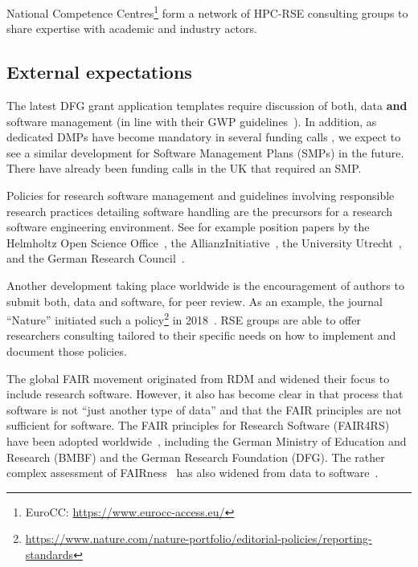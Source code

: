 \documentclass[a4paper]{article}
\begin{document}
 National Competence Centres\footnote{EuroCC: \url{https://www.eurocc-access.eu/}} form a network of HPC-RSE consulting groups to share expertise with academic and industry actors\autocite{eurocc_success_stories_2023,eurocc_success_stories_2024}.

\subsection{External expectations}

The latest DFG grant application templates require discussion of both, data \textbf{and} software management (in line with their GWP guidelines~\autocite{dfg_gsp}).
In addition, as dedicated DMPs have become mandatory in several funding calls , we expect to see a similar development for Software Management Plans (SMPs) in the future.  There have already been funding calls in the UK that required an SMP.

Policies for research software management and guidelines involving responsible research practices detailing software handling are the precursors for a research software engineering environment.
See for example position papers by the Helmholtz Open Science Office~\autocite{Helmholtz2019a,Helmholtz2019b},
the AllianzInitiative~\autocite{Konrad2021},
the University Utrecht~\autocite{Utrecht2016b},
and the German Research Council~\autocite{dfg_gsp}.

Another development taking place worldwide is the encouragement of authors to submit both, data and software, for peer review.
As an example, the journal “Nature” initiated such a policy\footnote{\url{https://www.nature.com/nature-portfolio/editorial-policies/reporting-standards}} in 2018~\autocite{Nature2018}.
RSE groups are able to offer researchers consulting tailored to their specific needs on how to implement and document those policies.

The global FAIR movement originated from RDM and widened their focus to include research software.
However, it also has become clear in that process that software is not “just another type of data” and that the FAIR principles are not sufficient for software.
The FAIR principles for Research Software (FAIR4RS)~\autocite{ChueHong2022} have been adopted worldwide~\autocite{Barker2024}, including the German Ministry of Education and Research (BMBF) and the German Research Foundation (DFG).
The rather complex assessment of FAIRness~\autocite{Wilkinson2023,FAIRmaturity} has also widened from data to software~\autocite{Lamprecht2020}.
\end{document}
